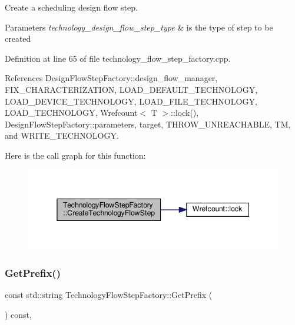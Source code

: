 Create a scheduling design flow step. 


\begin{DoxyParams}{Parameters}
{\em technology\+\_\+design\+\_\+flow\+\_\+step\+\_\+type} & is the type of step to be created \\
\hline
\end{DoxyParams}


Definition at line 65 of file technology\+\_\+flow\+\_\+step\+\_\+factory.\+cpp.



References Design\+Flow\+Step\+Factory\+::design\+\_\+flow\+\_\+manager, F\+I\+X\+\_\+\+C\+H\+A\+R\+A\+C\+T\+E\+R\+I\+Z\+A\+T\+I\+ON, L\+O\+A\+D\+\_\+\+D\+E\+F\+A\+U\+L\+T\+\_\+\+T\+E\+C\+H\+N\+O\+L\+O\+GY, L\+O\+A\+D\+\_\+\+D\+E\+V\+I\+C\+E\+\_\+\+T\+E\+C\+H\+N\+O\+L\+O\+GY, L\+O\+A\+D\+\_\+\+F\+I\+L\+E\+\_\+\+T\+E\+C\+H\+N\+O\+L\+O\+GY, L\+O\+A\+D\+\_\+\+T\+E\+C\+H\+N\+O\+L\+O\+GY, Wrefcount$<$ T $>$\+::lock(), Design\+Flow\+Step\+Factory\+::parameters, target, T\+H\+R\+O\+W\+\_\+\+U\+N\+R\+E\+A\+C\+H\+A\+B\+LE, TM, and W\+R\+I\+T\+E\+\_\+\+T\+E\+C\+H\+N\+O\+L\+O\+GY.

Here is the call graph for this function\+:
\nopagebreak
\begin{figure}[H]
\begin{center}
\leavevmode
\includegraphics[width=345pt]{dc/dc9/classTechnologyFlowStepFactory_a904613e01cfbfeccb66bb9218f3e99a5_cgraph}
\end{center}
\end{figure}
\mbox{\label{classTechnologyFlowStepFactory_a072cf55c638fc7b1940fa4521b38b9f2}} 
\subsubsection{\texorpdfstring{Get\+Prefix()}{GetPrefix()}}
{\footnotesize\ttfamily const std\+::string Technology\+Flow\+Step\+Factory\+::\+Get\+Prefix (\begin{DoxyParamCaption}{ }\end{DoxyParamCaption}) const\hspace{0.3cm}{\ttfamily [override]}, {\ttfamily [virtual]}}



